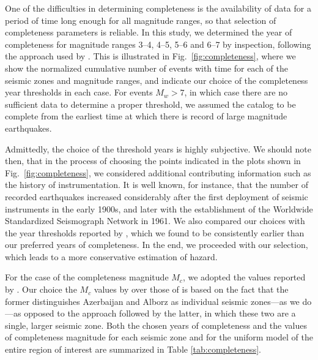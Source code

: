 One of the difficulties in determining completeness is the availability of data for a period of time long enough for all magnitude ranges, so that selection of completeness parameters is reliable. In this study, we determined the year of completeness for magnitude ranges 3--4, 4--5, 5--6 and 6--7 by inspection, following the approach used by \citet{Frankel1995}. This is illustrated in Fig.~\ref{fig:completeness}, where we show the normalized cumulative number of events with time for each of the seismic zones and magnitude ranges, and indicate our choice of the completeness year thresholds in each case. For events $M_w>7$, in which case there are no sufficient data to determine a proper threshold, we assumed the catalog to be complete from the earliest time at which there is record of large magnitude earthquakes. 

Admittedly, the choice of the threshold years is highly subjective. We should note then, that in the process of choosing the points indicated in the plots shown in Fig.~\ref{fig:completeness}, we considered additional contributing information such as the history of instrumentation. It is well known, for instance, that the number of recorded earthquakes increased considerably after the first deployment of seismic instruments in the early 1900s, and later with the establishment of the Worldwide Standardized Seismograph Network in 1961. We also compared our choices with the year thresholds reported by \citet{Zare2014}, which we found to be consistently earlier than our preferred years of completeness. In the end, we proceeded with our selection, which leads to a more conservative estimation of hazard.

For the case of the completeness magnitude $M_c$, we adopted the values reported by \citet{Karimiparidari2013}. Our choice the $M_c$ values by \citet{Karimiparidari2013} over those of \citet{Zare2014} is based on the fact that the former distinguishes Azerbaijan and Alborz as individual seismic zones---as we do---as opposed to the approach followed by the latter, in which these two are a single, larger seismic zone. Both the chosen years of completeness and the values of completeness magnitude for each seismic zone and for the uniform model of the entire region of interest are summarized in Table \ref{tab:completeness}.

